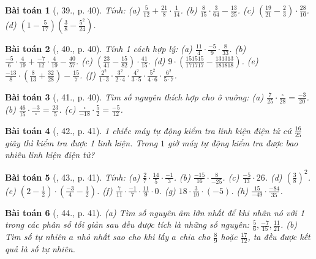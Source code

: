 \documentclass{article}
\newtheorem{baitoan}{Bài toán}
\begin{document}
\begin{baitoan}[\cite{SBT_Toan_6_Canh_Dieu_tap_2}, 39., p. 40]
	Tính: (a) $\frac{5}{12} + \frac{21}{8}\cdot\frac{1}{14}$. (b) $\frac{8}{15}\cdot\frac{3}{64} - \frac{13}{25}$. (c) $\left(\frac{19}{21} - \frac{2}{3}\right)\cdot\frac{28}{10}$. (d) $\left(1 - \frac{5}{17}\right)\left(\frac{3}{8} - \frac{5^2}{24}\right)$.
\end{baitoan}

\begin{baitoan}[\cite{SBT_Toan_6_Canh_Dieu_tap_2}, 40., p. 40]
	Tính 1 cách hợp lý: (a) $\frac{11}{4}\cdot\frac{-5}{9}\cdot\frac{8}{33}$. (b) $\frac{-5}{6}\cdot\frac{4}{19} + \frac{-7}{12}\cdot\frac{4}{19} - \frac{40}{57}$. (c) $\left(\frac{23}{41} - \frac{15}{82}\right)\cdot\frac{41}{15}$. (d) $9\cdot\left(\frac{151515}{171717} - \frac{131313}{181818}\right)$. (e) $\frac{-13}{8}\cdot\left(\frac{8}{13} + \frac{32}{28}\right) - \frac{15}{7}$. (f) $\frac{2^2}{1\cdot3}\cdot\frac{3^2}{2\cdot4}\cdot\frac{4^2}{3\cdot5}\cdot\frac{5^2}{4\cdot6}\cdot\frac{6^2}{5\cdot7}$.
\end{baitoan}

\begin{baitoan}[\cite{SBT_Toan_6_Canh_Dieu_tap_2}, 41., p. 40]
	Tìm số nguyên thích hợp cho ô vuông: (a) $\frac{7}{25}\cdot\frac{\square}{28} = \frac{-3}{20}$. (b) $\frac{46}{15}\cdot\frac{-3}{\square} = \frac{23}{5}$. (c) $\frac{\square}{-18}\cdot\frac{5}{2} = \frac{-5}{12}$.
\end{baitoan}

\begin{baitoan}[\cite{SBT_Toan_6_Canh_Dieu_tap_2}, 42., p. 41]
	1 chiếc máy tự động kiểm tra linh kiện điện tử cứ $\frac{16}{25}$ giây thì kiểm tra được 1 linh kiện. Trong $1$ giờ máy tự động kiểm tra được bao nhiêu linh kiện điện tử?
\end{baitoan}

\begin{baitoan}[\cite{SBT_Toan_6_Canh_Dieu_tap_2}, 43., p. 41]
	Tính: (a) $\frac{2}{7}\cdot\frac{14}{5}\cdot\frac{-1}{3}$. (b) $\frac{-15}{16}\cdot\frac{8}{-25}$. (c) $\frac{-5}{13}\cdot26$. (d) $\left(\frac{3}{8}\right)^2$. (e) $\left(2 - \frac{1}{2}\right)\cdot\left(\frac{-3}{4} - \frac{1}{2}\right)$. (f) $\frac{7}{11}\cdot\frac{-1}{7}\cdot\frac{11}{9}\cdot0$. (g) $18\cdot\frac{3}{10}\cdot(-5)$. (h) $\frac{15}{-49}\cdot\frac{-84}{35}$.
\end{baitoan}

\begin{baitoan}[\cite{SBT_Toan_6_Canh_Dieu_tap_2}, 44., p. 41]
	(a) Tìm số nguyên âm lớn nhất để khi nhân nó với 1 trong các phân số tối giản sau đều được tích là những số nguyên: $\frac{5}{6},\frac{-7}{15},\frac{11}{21}$. (b) Tìm số tự nhiên $a$ nhỏ nhất sao cho khi lấy $a$ chia cho $\frac{8}{9}$ hoặc $\frac{17}{12}$, ta đều được kết quả là số tự nhiên.
\end{baitoan}
\end{document}
